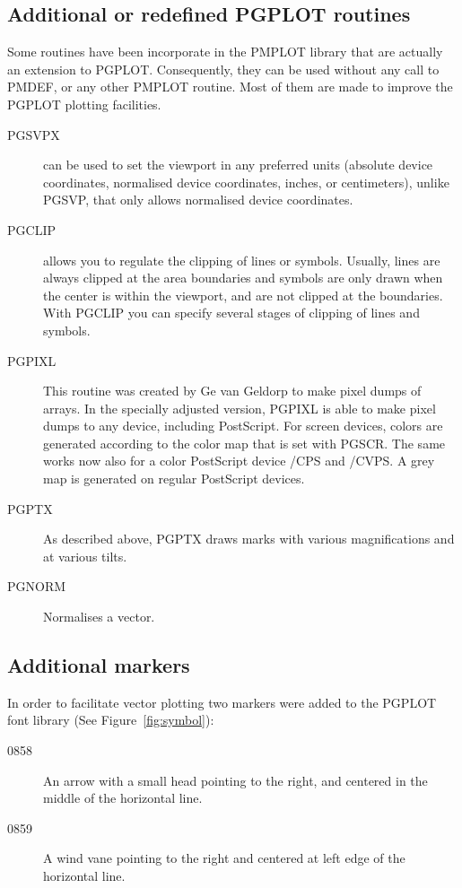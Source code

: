 \documentclass[titlepage,a4paper]{article}
\begin{document}
\subsection{Additional or redefined PGPLOT routines}
Some routines have been incorporate in the PMPLOT library that are actually
an extension to PGPLOT. Consequently, they can be used without any call to
PMDEF, or any other PMPLOT routine. Most of them are made to improve
the PGPLOT plotting facilities.

\begin{description}
\item[PGSVPX]
can be used to set the viewport in any preferred units (absolute device
coordinates, normalised device coordinates, inches, or centimeters), unlike
PGSVP, that only allows normalised device coordinates.

\item[PGCLIP]
allows you to regulate the clipping of lines or symbols. Usually,
lines are always clipped at the area boundaries and symbols are only
drawn when the center is within the viewport, and are not clipped at the
boundaries. With PGCLIP you can specify several stages of clipping of
lines and symbols.

\item[PGPIXL]
This routine was created by Ge van Geldorp to make pixel dumps of arrays.
In the specially adjusted version, PGPIXL is able to make pixel dumps
to any device, including PostScript. For screen devices, colors are
generated according to the color map that is set with PGSCR. The same
works now also for a color PostScript device /CPS and /CVPS. A grey
map is generated on regular PostScript devices.

\item[PGPTX]
As described above, PGPTX draws marks with various magnifications and
at various tilts.

\item[PGNORM]
Normalises a vector.

\end{description}

\subsection{Additional markers}
In order to facilitate vector plotting two markers were added to the PGPLOT
font library (See Figure~\ref{fig:symbol}):
\begin{description}
\item[0858]
An arrow with a small head pointing to the right, and centered
in the middle of the horizontal line.
\item[0859]
A wind vane pointing to the
right and centered at left edge of the horizontal line.
\end{description}
\end{document}
